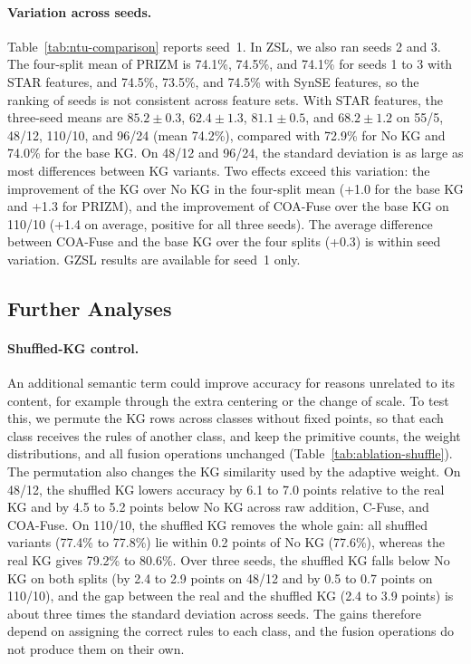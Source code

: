 \documentclass[11pt]{article}
\begin{document}
\paragraph{Variation across seeds.}
\label{sec:seeds}
Table~\ref{tab:ntu-comparison} reports seed~1. In ZSL, we also ran seeds 2 and 3. The four-split mean of PRIZM is 74.1\%, 74.5\%, and 74.1\% for seeds 1 to 3 with STAR features, and 74.5\%, 73.5\%, and 74.5\% with SynSE features, so the ranking of seeds is not consistent across feature sets. With STAR features, the three-seed means are $85.2 \pm 0.3$, $62.4 \pm 1.3$, $81.1 \pm 0.5$, and $68.2 \pm 1.2$ on 55/5, 48/12, 110/10, and 96/24 (mean 74.2\%), compared with 72.9\% for No KG and 74.0\% for the base KG. On 48/12 and 96/24, the standard deviation is as large as most differences between KG variants. Two effects exceed this variation: the improvement of the KG over No KG in the four-split mean (+1.0 for the base KG and +1.3 for PRIZM), and the improvement of COA-Fuse over the base KG on 110/10 (+1.4 on average, positive for all three seeds). The average difference between COA-Fuse and the base KG over the four splits (+0.3) is within seed variation. GZSL results are available for seed~1 only.

\subsection{Further Analyses}
\label{sec:further}

\paragraph{Shuffled-KG control.}
An additional semantic term could improve accuracy for reasons unrelated to its content, for example through the extra centering or the change of scale. To test this, we permute the KG rows across classes without fixed points, so that each class receives the rules of another class, and keep the primitive counts, the weight distributions, and all fusion operations unchanged (Table~\ref{tab:ablation-shuffle}). The permutation also changes the KG similarity used by the adaptive weight. On 48/12, the shuffled KG lowers accuracy by 6.1 to 7.0 points relative to the real KG and by 4.5 to 5.2 points below No KG across raw addition, C-Fuse, and COA-Fuse. On 110/10, the shuffled KG removes the whole gain: all shuffled variants (77.4\% to 77.8\%) lie within 0.2 points of No KG (77.6\%), whereas the real KG gives 79.2\% to 80.6\%. Over three seeds, the shuffled KG falls below No KG on both splits (by 2.4 to 2.9 points on 48/12 and by 0.5 to 0.7 points on 110/10), and the gap between the real and the shuffled KG (2.4 to 3.9 points) is about three times the standard deviation across seeds. The gains therefore depend on assigning the correct rules to each class, and the fusion operations do not produce them on their own.
\end{document}
